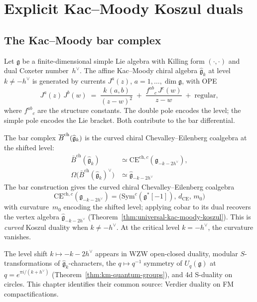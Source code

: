 \chapter{Explicit Kac--Moody Koszul duals}\label{chap:kac-moody-koszul}
\label{chap:kac-moody}

\section{The Kac--Moody bar complex}%
\label{sec:km-bar-complex}

Let $\mathfrak{g}$ be a finite-dimensional simple Lie algebra with
Killing form $(\cdot,\cdot)$ and dual Coxeter number~$h^\vee$.
The affine Kac--Moody chiral algebra $\widehat{\mathfrak{g}}_k$
at level $k \neq -h^\vee$ is generated by currents
$J^a(z)$, $a = 1, \ldots, \dim \mathfrak{g}$, with OPE
\[
  J^a(z)\,J^b(w) \;=\; \frac{k\,(a,b)}{(z-w)^2}
  \;+\; \frac{f^{ab}{}_c \, J^c(w)}{z-w}
  \;+\; \text{regular},
\]
where $f^{ab}{}_c$ are the structure constants.  The double pole
encodes the level; the simple pole encodes the Lie bracket.  Both
contribute to the bar differential.

The bar complex $\overline{B}^{\mathrm{ch}}(\widehat{\mathfrak{g}}_k)$ is
the curved chiral Chevalley--Eilenberg coalgebra at the shifted level:
\begin{align}\label{eq:kac-moody-koszul-basic}
\bar{B}^{\mathrm{ch}}(\widehat{\mathfrak{g}}_k) &\simeq \mathrm{CE}^{\mathrm{ch},c}(\mathfrak{g}_{-k-2h^\vee}), \nonumber\\
\Omega\bigl(\bar{B}^{\mathrm{ch}}(\widehat{\mathfrak{g}}_k)^\vee\bigr) &\simeq \widehat{\mathfrak{g}}_{-k-2h^\vee}
\end{align}
The bar construction gives the curved chiral Chevalley--Eilenberg
coalgebra
\[
\mathrm{CE}^{\mathrm{ch},c}(\mathfrak{g}_{-k-2h^\vee})
= \bigl(\mathrm{Sym}^c(\mathfrak{g}^*[-1]),\, d_{\mathrm{CE}},\, m_0\bigr)
\]
with curvature~$m_0$ encoding the shifted level; applying cobar
to its dual recovers the vertex algebra
$\widehat{\mathfrak{g}}_{-k-2h^\vee}$
(Theorem~\ref{thm:universal-kac-moody-koszul}).
This is \emph{curved} Koszul duality when $k \neq -h^\vee$.
At the critical level $k = -h^\vee$, the curvature vanishes.

\begin{remark}
The level shift $k \mapsto -k - 2h^\vee$ appears in WZW open-closed duality, modular $S$-transformations of $\widehat{\mathfrak{g}}_k$-characters, the $q \mapsto q^{-1}$ symmetry of $U_q(\mathfrak{g})$ at $q = e^{\pi i/(k+h^\vee)}$ (Theorem~\ref{thm:km-quantum-groups}), and 4d S-duality on circles.  This chapter identifies their common source: Verdier duality on FM compactifications.
\end{remark}

